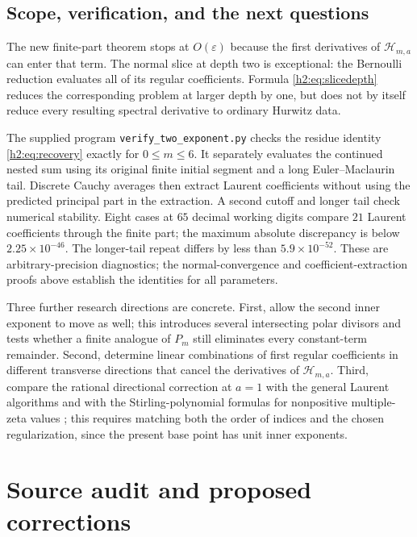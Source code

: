 \documentclass[11pt,a4paper]{article}
\theoremstyle{definition}
\theoremstyle{remark}
\numberwithin{equation}{section}
\begin{document}
\subsection{Scope, verification, and the next questions}

The new finite-part theorem stops at $O(\varepsilon)$ because the
first derivatives of $\mathcal H_{m,a}$ can enter that term.
The normal slice at depth two is exceptional: the Bernoulli reduction
evaluates all of its regular coefficients. Formula
\eqref{h2:eq:slicedepth} reduces the corresponding problem at larger
depth by one, but does not by itself reduce every resulting spectral
derivative to ordinary Hurwitz data.

The supplied program \texttt{verify\_two\_exponent.py} checks the
residue identity \eqref{h2:eq:recovery} exactly for $0\le m\le6$.
It separately evaluates the continued nested sum using its original
finite initial segment and a long Euler--Maclaurin tail. Discrete Cauchy
averages then extract Laurent coefficients without using the predicted
principal part in the extraction. A second cutoff and longer tail
check numerical stability. Eight cases at $65$ decimal working digits
compare $21$ Laurent coefficients through the finite part; the maximum
absolute discrepancy is below $2.25\times10^{-46}$. The longer-tail
repeat differs by less than $5.9\times10^{-52}$. These are
arbitrary-precision diagnostics;
the normal-convergence and coefficient-extraction proofs above establish
the identities for all parameters.

Three further research directions are concrete. First, allow the
second inner exponent to move as well; this introduces several
intersecting polar divisors and tests whether a finite analogue of
$P_m$ still eliminates every constant-term remainder. Second, determine
linear combinations of first regular coefficients in different
transverse directions that cancel the derivatives of
$\mathcal H_{m,a}$. Third, compare the rational directional correction
at $a=1$ with the general Laurent algorithms and with the
Stirling-polynomial formulas for nonpositive multiple-zeta values
\cite{h2:MOW,h2:IshiiShinohara}; this requires matching both the order of
indices and the chosen regularization, since the present base point has
unit inner exponents.


\section{Source audit and proposed corrections}
\label{audit:sec}
\end{document}

